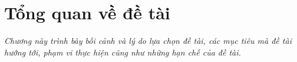 \chapter{Tổng quan về đề tài}
\label{chapter:tongquan}

\textit{Chương này trình bày bối cảnh và lý do lựa chọn đề tài, các mục tiêu mà đề tài hướng tới, phạm vi thực hiện cũng như những hạn chế của đề tài.}





